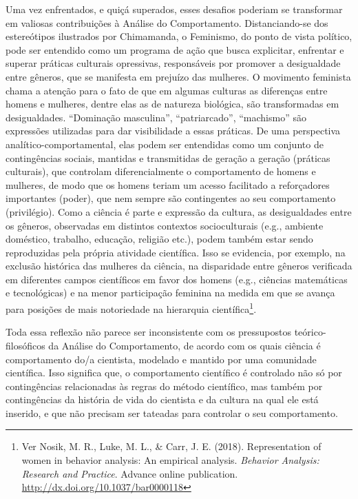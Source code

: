 Uma vez enfrentados, e quiçá superados, esses desafios poderiam se transformar em valiosas contribuições à Análise do Comportamento. Distanciando-se dos estereótipos ilustrados por Chimamanda, o Feminismo, do ponto de vista político, pode ser entendido como um programa de ação que busca explicitar, enfrentar e superar práticas culturais opressivas, responsáveis por promover a desigualdade entre gêneros, que se manifesta em prejuízo das mulheres. O movimento feminista chama a atenção para o fato de que em algumas culturas as diferenças entre homens e mulheres, dentre elas as de natureza biológica, são transformadas em desigualdades. “Dominação masculina”, “patriarcado”, “machismo” são expressões utilizadas para dar visibilidade a essas práticas. De uma perspectiva analítico-comportamental, elas podem ser entendidas como um conjunto de contingências sociais, mantidas e transmitidas de geração a geração (práticas culturais), que controlam diferencialmente o comportamento de homens e mulheres, de modo que os homens teriam um acesso facilitado a reforçadores importantes (poder), que nem sempre são contingentes ao seu comportamento (privilégio). 
Como a ciência é parte e expressão da cultura, as desigualdades entre os gêneros, observadas em distintos contextos socioculturais (e.g., ambiente doméstico, trabalho, educação, religião etc.), podem também estar sendo reproduzidas pela própria atividade científica. Isso se evidencia, por exemplo, na exclusão histórica das mulheres da ciência, na disparidade entre gêneros verificada em diferentes campos científicos em favor dos homens (e.g., ciências matemáticas e tecnológicas) e na menor participação feminina na medida em que se avança para posições de mais notoriedade na hierarquia científica\footnote{Ver Nosik, M. R., Luke, M. L., \& Carr, J. E. (2018). Representation of women in behavior analysis: An empirical analysis. \emph{Behavior Analysis: Research and Practice}. Advance online publication. \url{http://dx.doi.org/10.1037/bar0000118}}. 

Toda essa reflexão não parece ser inconsistente com os pressupostos teórico-filosóficos da Análise do Comportamento, de acordo com os quais ciência é comportamento do/a cientista, modelado e mantido por uma comunidade científica. Isso significa que, o comportamento científico é controlado não só por contingências relacionadas às regras do método científico, mas também por contingências da história de vida do cientista e da cultura na qual ele está inserido, e que não precisam ser tateadas para controlar o seu comportamento.

